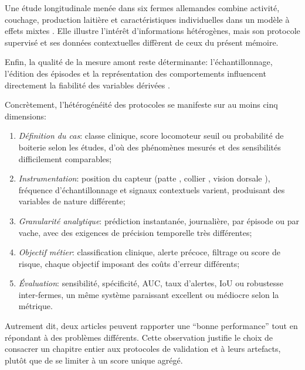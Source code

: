 Une étude longitudinale menée dans six fermes allemandes combine activité, couchage,
production laitière et caractéristiques individuelles dans un modèle à effets mixtes
\citep{lavrova2023lameness}. Elle illustre l'intérêt d'informations hétérogènes, mais son
protocole supervisé et ses données contextuelles diffèrent de ceux du présent mémoire.

Enfin, la qualité de la mesure amont reste déterminante: l'échantillonnage, l'édition des
épisodes et la représentation des comportements influencent directement la fiabilité des
variables dérivées \citep{ledgerwood2010lying,balasso2023behaviour}.

Concrètement, l'hétérogénéité des protocoles se manifeste sur au moins cinq dimensions:
\begin{enumerate}
    \item \textit{Définition du cas}: classe clinique, score locomoteur seuil ou probabilité
    de boiterie selon les études, d'où des phénomènes mesurés et des sensibilités
    difficilement comparables;
    \item \textit{Instrumentation}: position du capteur (patte
    \citep{alsaaod2012electronic,thorup2015lameness}, collier
    \citep{vanhertem2013lameness}, vision dorsale \citep{viazzi2013analysis}), fréquence
    d'échantillonnage et signaux
    contextuels varient, produisant des variables de nature différente;
    \item \textit{Granularité analytique}: prédiction instantanée, journalière, par épisode
    ou par vache, avec des exigences de précision temporelle très différentes;
    \item \textit{Objectif métier}: classification clinique, alerte précoce, filtrage ou
    score de risque, chaque objectif imposant des coûts d'erreur différents;
    \item \textit{Évaluation}: sensibilité, spécificité, AUC, taux d'alertes, IoU ou
    robustesse inter-fermes, un même système paraissant excellent ou médiocre selon la
    métrique.
\end{enumerate}

Autrement dit, deux articles peuvent rapporter une ``bonne performance'' tout en répondant à
des problèmes différents. Cette observation justifie le choix de consacrer un chapitre entier
aux protocoles de validation et à leurs artefacts, plutôt que de se limiter à un score unique
agrégé.

\FloatBarrier

